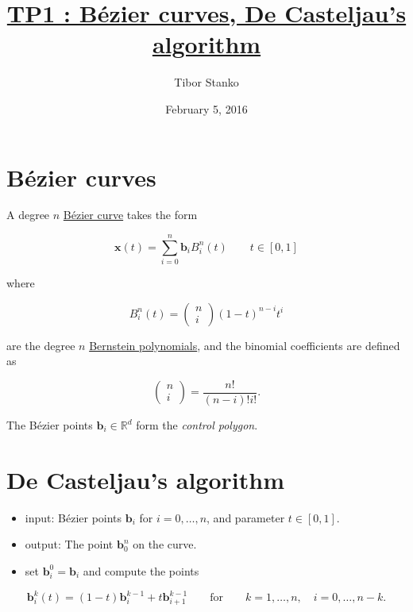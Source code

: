 \documentclass{article}
\begin{document}
\title{\href{https://tiborstanko.sk/teaching/geo-num-2016/tp1.html}{TP1 : Bézier curves, De Casteljau's algorithm}}\label{tp1-buxe9zier-curves-de-casteljaus-algorithm}
\date{February 5, 2016}
\author{Tibor Stanko}
\maketitle

\section{Bézier curves}\label{buxe9zier-curves}

A degree \(n\)
\href{https://en.wikipedia.org/wiki/B\%C3\%A9zier_curve}{Bézier curve}
takes the form

\[
\mathbf x(t) = \sum_{i=0}^{n} \mathbf b_i B_i^n(t) \qquad t \in [0,1]
\]

where

\[
B_{i}^{n}(t) = \begin{pmatrix}n \\ i\end{pmatrix} (1-t)^{n-i} t^i
\]

are the degree \(n\)
\href{https://en.wikipedia.org/wiki/Bernstein_polynomial}{Bernstein
polynomials}, and the binomial coefficients are defined as

\[
\begin{pmatrix}n \\ i\end{pmatrix} = \frac{n!}{(n-i)! i!}.
\]

The Bézier points \(\mathbf b_i \in \mathbb R^d\) form the \emph{control
polygon}.

\section{De Casteljau's algorithm}\label{de-casteljaus-algorithm}

\begin{itemize}
\itemsep1pt\parskip0pt
\item
  input: Bézier points \(\mathbf b_i\) for \(i = 0, \dots, n\), and
  parameter \(t \in [0,1]\).
\item
  output: The point \(\mathbf b_0^n\) on the curve.
\item
  set \(\mathbf b_i^0 = \mathbf b_i\) and compute the points
\end{itemize}
\[
\mathbf b_i^k (t) = (1-t) \mathbf b_i^{k-1} + t \mathbf b_{i+1}^{k-1} \qquad \text{for} \qquad k=1,\dots,n, \quad i=0,\dots,n-k.
\]
\end{document}
